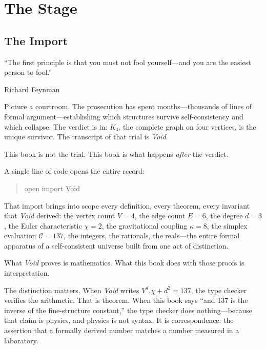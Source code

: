 \documentclass[11pt,a4paper]{book}
\def\cdot{.}%
\def\texttt#1{#1}%
\begin{document}
\part{The Stage}

\chapter{The Import}
\label{ch:the-import}

\epigraph{``The first principle is that you must not fool yourself---and you are the easiest person to fool.''}{Richard Feynman}

Picture a courtroom. The prosecution has spent months---thousands of lines of formal argument---establishing which structures survive self-consistency and which collapse. The verdict is in: $K_4$, the complete graph on four vertices, is the unique survivor. The transcript of that trial is \textit{Void}.

This book is not the trial. This book is what happens \emph{after} the verdict.

A single line of code opens the entire record:

\begin{quote}
\texttt{open import Void}
\end{quote}

That import brings into scope every definition, every theorem, every invariant that \textit{Void} derived: the vertex count $V = 4$, the edge count $E = 6$, the degree $d = 3$, the Euler characteristic $\chi = 2$, the gravitational coupling $\kappa = 8$, the simplex evaluation $\mathcal{C} = 137$, the integers, the rationals, the reals---the entire formal apparatus of a self-consistent universe built from one act of distinction.

What \textit{Void} proves is mathematics. What this book does with those proofs is interpretation.

The distinction matters. When \textit{Void} writes $V^d \cdot \chi + d^2 = 137$, the type checker verifies the arithmetic. That is theorem. When this book says ``and 137 is the inverse of the fine-structure constant,'' the type checker does nothing---because that claim is physics, and physics is not syntax. It is correspondence: the assertion that a formally derived number matches a number measured in a laboratory.
\end{document}
